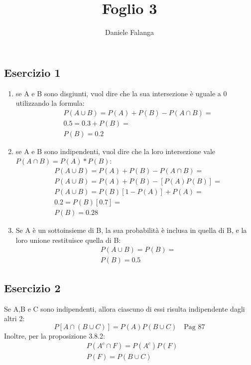 \documentclass[12pt]{article}
\title{\textbf{Foglio 3}}
\author{Daniele Falanga}
\date{}
\begin{document}
\maketitle

\subsection*{Esercizio 1}
\begin{enumerate}
    \item se A e B sono disgiunti, vuol dire che la sua intersezione è uguale a 0
    utilizzando la formula:    
    \begin{align*}
        &P(A \cup B) = P(A) + P(B) - P(A \cap B) = \\
        &0.5 = 0.3 + P(B) = \\
        &P(B) = 0.2
    \end{align*}
    \item se A e B sono indipendenti, vuol dire che la loro intersezione vale \(P(A \cap B) = P(A)*P(B)\):
    \begin{align*}
        &P(A \cup B) = P(A) + P(B) - P(A \cap B) =  \\
        &P(A \cup B) = P(A) + P(B) - [P(A)P(B)] = \\ 
        &P(A \cup B) = P(B)[1-P(A)] + P(A) = \\
        &0.2 = P(B)[0.7] = \\
        &P(B) = 0.28
    \end{align*}        
    \item Se A è un sottoinsieme di B, la sua probabilità è inclusa in quella di B, e la loro unione
    restituisce quella di B:
    \begin{align*}
        &P(A \cup B) = P(B) = \\
        &P(B) = 0.5 
    \end{align*}
\end{enumerate}

\subsection*{Esercizio 2}

Se A,B e C sono indipendenti, allora ciascuno di essi risulta indipendente dagli altri 2:
\[
P[A \cap (B \cup C)] = P(A)P(B \cup C) \quad \text{Pag 87}    
\]
Inoltre, per la proposizione 3.8.2:
\begin{align*}
    &P(A^c \cap F) = P(A^c)P(F) \\
    &P(F) = P(B \cup C)    
\end{align*}
\end{document}
